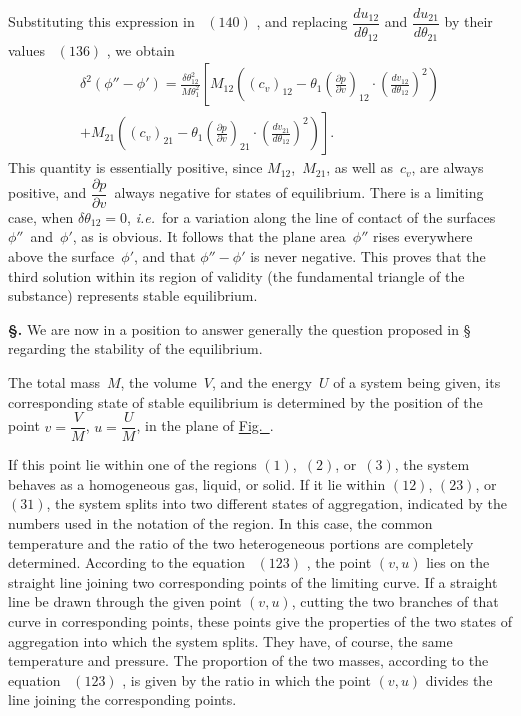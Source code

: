 \documentclass[12pt]{book}[2005/09/16]
\newcommand{\Section}[1]{
  \medskip\par\textbf{§\;#1}
  \label{section:#1}
}
\newcommand{\SecRef}[2][§\;]{\hyperref[section:#2.]{{\upshape #1#2}}}
\newcommand{\Eq}[1]{%
  \hyperref[eqn:#1]{\ensuremath{#1}}%
}
\newcommand{\Fig}[1]{\hyperref[fig:#1]{Fig.~{\upshape #1}}}
\newcommand{\PageSep}[1]{\ignorespaces}
\newcommand{\ie}{\emph{i.e.}}
\newcommand{\dd}{\partial}
\begin{document}
Substituting this expression in~\Eq{(140)}, and replacing $\dfrac{du_{12}}{d\theta_{12}}$
and $\dfrac{du_{21}}{d\theta_{21}}$ by their values~\Eq{(136)}, we obtain
\begin{multline*}
\delta^{2} (\phi'' - \phi')
  = \frac{\delta \theta_{12}^{2}}{M \theta_{1}^{2}} \left[M_{12} \left((c_{v})_{12} - \theta_{1} \left(\frac{\dd p}{\dd v}\right)_{12} · \left(\frac{dv_{12}}{d\theta_{12}}\right)^{2}\right)\right. \\
  + \left.M_{21} \left((c_{v})_{21} - \theta_{1} \left(\frac{\dd p}{\dd v}\right)_{21} · \left(\frac{dv_{21}}{d\theta_{12}}\right)^{2}\right)\right].
\end{multline*}
This quantity is essentially positive, since $M_{12}$,~$M_{21}$, as well
as~$c_{v}$, are always positive, and $\dfrac{\dd p}{\dd v}$~always negative for states
of equilibrium. There is a limiting case, when $\delta \theta_{12} = 0$,
\ie\ for a variation along the line of contact of the surfaces
$\phi''$~and~$\phi'$, as is obvious. It follows that the plane area~$\phi''$
rises everywhere above the surface~$\phi'$, and that $\phi'' - \phi'$ is
never negative. This proves that the third solution within
\PageSep{171}
its region of validity (the fundamental triangle of the substance)
represents stable equilibrium.

\Section{196.} We are now in a position to answer generally the
question proposed in \SecRef{165} regarding the stability of the
equilibrium.

The total mass~$M$, the volume~$V$, and the energy~$U$ of
a system being given, its corresponding state of stable
equilibrium is determined by the position of the point
$v = \dfrac{V}{M}$, $u = \dfrac{U}{M}$, in the plane of \Fig{4}.

If this point lie within one of the regions $(1)$,~$(2)$, or~$(3)$,
the system behaves as a homogeneous gas, liquid, or solid.
If it lie within $(12)$, $(23)$, or~$(31)$, the system splits into two
different states of aggregation, indicated by the numbers
used in the notation of the region. In this case, the common
temperature and the ratio of the two heterogeneous portions
are completely determined. According to the equation~\Eq{(123)},
the point $(v, u)$ lies on the straight line joining two
corresponding points of the limiting curve. If a straight
line be drawn through the given point $(v, u)$, cutting the
two branches of that curve in corresponding points, these
points give the properties of the two states of aggregation
into which the system splits. They have, of course, the
same temperature and pressure. The proportion of the
two masses, according to the equation~\Eq{(123)}, is given by
the ratio in which the point $(v, u)$ divides the line joining
the corresponding points.
\end{document}
